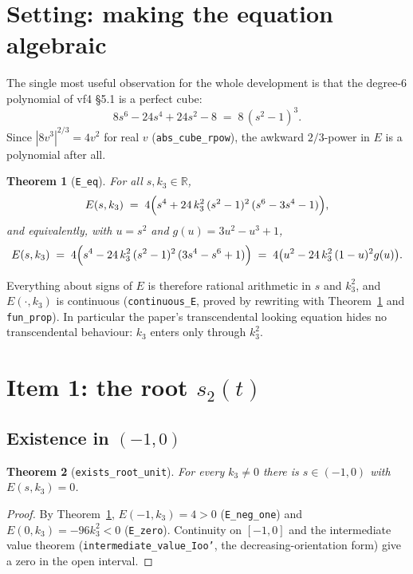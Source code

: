 \documentclass[11pt,a4paper]{article}
\newcommand{\R}{\mathbb{R}}
\newcommand{\lb}{\_\allowbreak}
\newcommand{\code}[1]{\texttt{#1}}
\newtheorem{theorem}{Theorem}[section]
\theoremstyle{definition}
\theoremstyle{remark}
\begin{document}
\section{Setting: making the equation algebraic}\label{sec:setup}

The single most useful observation for the whole development is that the degree-6
polynomial of vf4 \S5.1 is a perfect cube:
\begin{equation}\label{eq:cube}
  8s^6-24s^4+24s^2-8 \;=\; 8\,(s^2-1)^3 .
\end{equation}
Since $|8v^3|^{2/3}=4v^2$ for real $v$ (\code{abs\lb cube\lb rpow}), the awkward
$2/3$-power in $E$ is a polynomial after all.

\begin{theorem}[\code{E\lb eq}]\label{thm:Eeq}
For all $s,k_3\in\R$,
\[
  E(s,k_3) \;=\; 4\Bigl(s^4+24\,k_3^2\,(s^2-1)^2\,(s^6-3s^4-1)\Bigr),
\]
and equivalently, with $u=s^2$ and $g(u)=3u^2-u^3+1$,
\[
  E(s,k_3) \;=\; 4\Bigl(s^4-24\,k_3^2\,(s^2-1)^2\,(3s^4-s^6+1)\Bigr)
  \;=\; 4\bigl(u^2-24\,k_3^2\,(1-u)^2 g(u)\bigr).
\]
\end{theorem}

Everything about signs of $E$ is therefore rational arithmetic in $s$ and $k_3^2$, and
$E(\cdot,k_3)$ is continuous (\code{continuous\lb E}, proved by rewriting with
Theorem~\ref{thm:Eeq} and \code{fun\lb prop}).  In particular the paper's transcendental
looking equation hides no transcendental behaviour: $k_3$ enters only through $k_3^2$.

\section{Item 1: the root $s_2(t)$}\label{sec:item1}

\subsection{Existence in $(-1,0)$}

\begin{theorem}[\code{exists\lb root\lb unit}]
For every $k_3\neq0$ there is $s\in(-1,0)$ with $E(s,k_3)=0$.
\end{theorem}
\begin{proof}
By Theorem~\ref{thm:Eeq}, $E(-1,k_3)=4>0$ (\code{E\lb neg\lb one}) and
$E(0,k_3)=-96k_3^2<0$ (\code{E\lb zero}).  Continuity on $[-1,0]$ and the intermediate
value theorem (\code{intermediate\lb value\lb Ioo'}, the decreasing-orientation form) give a
zero in the open interval.
\end{proof}
\end{document}
